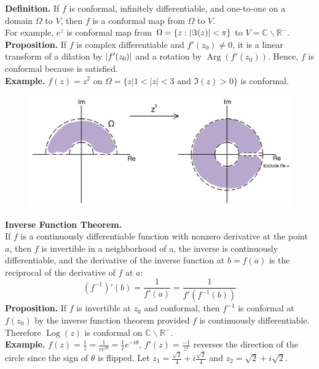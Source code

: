 \documentclass[11pt]{article}
\newcommand*\circled[1]{\tikz[baseline=(char.base)]{
            \node[shape=circle,draw,inner sep=2pt] (char) {#1};}}
\DeclarePairedDelimiter\abs{\lvert}{\rvert}
\begin{document}
\textbf{Definition.} If $f$ is conformal, infinitely differentiable, and one-to-one on a domain $\Omega$ to $V$, then $f$ is a conformal map from $\Omega$ to $V$. \\
For example, $e^z$ is conformal map from $\Omega = \{z:\abs{\Im(z)} < \pi \}$ to $V = \mathbb{C} \backslash \mathbb{R}^-$. \\
\newline
\textbf{Proposition.} If $f$ is complex differentiable and $f'(z_0) \neq 0$, it is a linear transform of a dilation by $\abs{f'(z_0)}$ and a rotation by $\operatorname{Arg}(f'(z_0))$. Hence, $f$ is conformal because \circled{3} is satisfied. \\
\newline
\textbf{Example.} $f(z) = z^2$ on $\Omega = \{z| 1< |z| < 3 \text{ and } \Im(z) > 0 \}$ is conformal. 
\begin{figure}[H]
\includegraphics[scale = 0.25]{9_6}
\centering
\end{figure}
\textbf{Inverse Function Theorem.} \\ 
If $f$ is a continuously differentiable function with nonzero derivative at the point $a$, then $f$ is invertible in a neighborhood of a, the inverse is continuously differentiable, and the derivative of the inverse function at $b=f(a)$ is the reciprocal of the derivative of $f$ at $a$: 
$$\left(f^{-1}\right)'(b) = \frac{1}{f'(a)} = \frac{1}{f'\left(f^{-1}(b)\right)}$$
\textbf{Proposition.} If $f$ is invertible at $z_0$ and conformal, then $f^{-1}$ is conformal at $f(z_0)$ by the inverse function theorem provided $f$ is continuously differentiable. Therefore $\operatorname{Log}(z)$ is conformal on $\mathbb{C} \backslash \mathbb{R}^-$. \\
\newpage
\textbf{Example.} $f(z) = \frac{1}{z} = \frac{1}{re^{i\theta}} = \frac{1}{r}e^{-i\theta}$, $f'(z) = \frac{-1}{z^2}$ reverses the direction of the circle since the sign of $\theta$ is flipped. 
Let $z_1 = \frac{\sqrt{2}}{4} + i\frac{\sqrt{2}}{4}$ and $z_2 = \sqrt{2} + i\sqrt{2}$.
\end{document}
